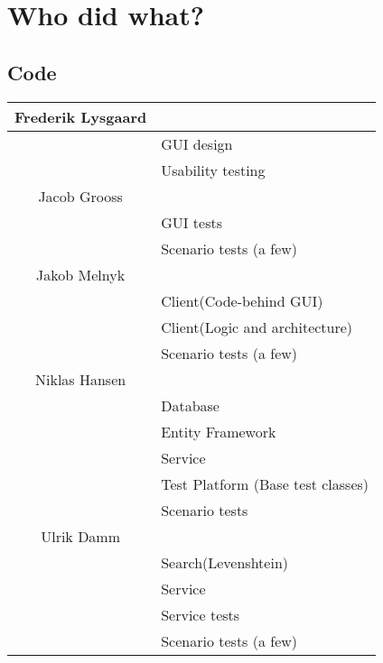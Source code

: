 \chapter{Who did what?}
\label{Appendix_Who}

\section{Code}
\label{Appendix_Who}
\begin{longtable}{| c | p{9cm} |}
\hline
Frederik Lysgaard & \\
\hline
& GUI design\\
\hline
& Usability testing\\
\hline
Jacob Grooss & \\
\hline
& GUI tests\\
\hline
& Scenario tests (a few)\\
\hline
Jakob Melnyk & \\
\hline
& Client(Code-behind GUI)\\
\hline
& Client(Logic and architecture)\\
\hline
& Scenario tests (a few)\\
\hline
Niklas Hansen & \\
\hline
& Database\\
\hline
& Entity Framework\\
\hline 
& Service\\
\hline
& Test Platform (Base test classes)\\
\hline
& Scenario tests\\
\hline
Ulrik Damm & \\
\hline
& Search(Levenshtein)\\
\hline
& Service\\
\hline
& Service tests\\
\hline
& Scenario tests (a few)\\
\hline
\end{longtable}

